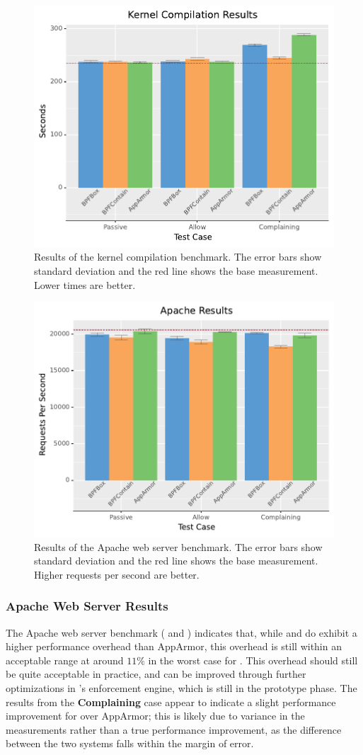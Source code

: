 \begin{figure}[htp]
  \centering
  \includegraphics[width=0.6\linewidth]{results/graphs/Kernel-Compilation.pdf}
  \caption[Results of the kernel compilation benchmark]{
    Results of the kernel compilation benchmark.
    The error bars show standard deviation and the red line shows the base measurement.
    Lower times are better.
  }%
  \label{fig:phoronix-kernel}
\end{figure}

\begin{figure}[htp]
  \centering
  \includegraphics[width=0.6\linewidth]{results/graphs/Apache.pdf}
  \caption[Results of the Apache web server benchmark]{
    Results of the Apache web server benchmark.
    The error bars show standard deviation and the red line shows the base measurement.
    Higher requests per second are better.
  }%
  \label{fig:phoronix-apache}
\end{figure}


\subsubsection{Apache Web Server Results}

The Apache web server benchmark ( and
) indicates that, while \bpfbox{} and \bpfcontain{} do exhibit
a higher performance overhead than AppArmor, this overhead is still within an acceptable
range at around $11\%$ in the worst case for \bpfcontain{}. This overhead should still be
quite acceptable in practice, and can be improved through further optimizations in
\bpfcontain{}'s enforcement engine, which is still in the prototype phase. The results
from the \textbf{Complaining} case appear to indicate a slight performance improvement for
\bpfbox{} over AppArmor; this is likely due to variance in the measurements rather than
a true performance improvement, as the difference between the two systems falls within the
margin of error.

